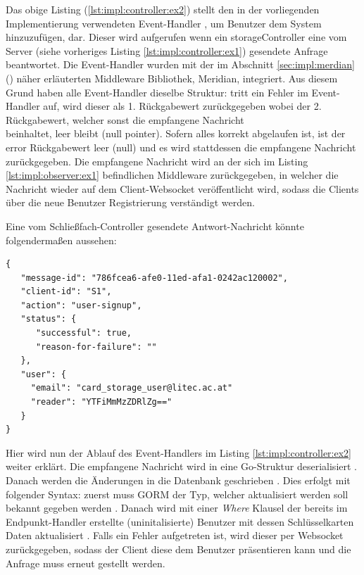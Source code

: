 Das obige Listing (\ref{lst:impl:controller:ex2}) stellt den in der vorliegenden Implementierung verwendeten Event-Handler , um Benutzer dem System hinzuzufügen, dar. Dieser wird aufgerufen wenn ein \gls{storageController} eine vom Server (siehe vorheriges Listing \ref{lst:impl:controller:ex1}) gesendete Anfrage beantwortet. Die Event-Handler wurden mit der im Abschnitt \ref{sec:impl:merdian} () näher erläuterten Middleware Bibliothek, Meridian, integriert. Aus diesem Grund haben alle Event-Handler   dieselbe Struktur: tritt ein Fehler im Event-Handler auf, wird dieser als 1. Rückgabewert zurückgegeben  wobei der 2. Rückgabewert, welcher sonst die empfangene Nachricht\\  beinhaltet, leer bleibt (null pointer). Sofern alles korrekt abgelaufen ist, ist der error Rückgabewert leer (null) und es wird stattdessen die empfangene Nachricht zurückgegeben. Die empfangene Nachricht wird an der sich im Listing \ref{lst:impl:observer:ex1} befindlichen  Middleware zurückgegeben, in welcher die Nachricht wieder auf dem Client-Websocket  veröffentlicht wird, sodass die Clients über die neue Benutzer Registrierung verständigt werden.\bigskip

\noindent
Eine vom Schließfach-Controller gesendete Antwort-Nachricht könnte folgendermaßen aussehen:
\begin{lstlisting}[style=goMono,label={lst:impl:eventhandlerdispatcher:ex5},caption={\centering Antwort: Ausformulierte JSON-Repräsentation einer Benutzerregistrierung}]
{
   "message-id": "786fcea6-afe0-11ed-afa1-0242ac120002",
   "client-id": "S1",   
   "action": "user-signup",
   "status": {
      "successful": true,
      "reason-for-failure": ""
   },
   "user": {
     "email": "card_storage_user@litec.ac.at"
     "reader": "YTFiMmMzZDRlZg=="
   }
}
\end{lstlisting}
Hier wird nun der Ablauf des Event-Handlers im Listing \ref{lst:impl:controller:ex2} weiter erklärt. Die empfangene Nachricht  wird in eine Go-Struktur  deserialisiert . Danach werden die Änderungen in die Datenbank geschrieben . Dies erfolgt mit folgender Syntax: zuerst muss GORM der Typ, welcher aktualisiert werden soll bekannt gegeben werden . Danach wird mit einer \textit{Where} Klausel  der bereits im Endpunkt-Handler erstellte (uninitalisierte) Benutzer mit dessen Schlüsselkarten Daten aktualisiert . Falls ein Fehler aufgetreten ist, wird dieser per Websocket zurückgegeben, sodass der Client diese dem Benutzer präsentieren kann und die Anfrage muss erneut gestellt werden.

